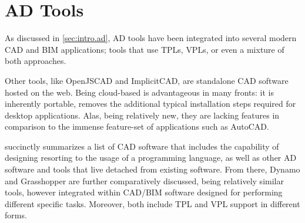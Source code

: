 \section{\acl{AD} Tools}%
\label{sec:related.ad}

As discussed in \cref{sec:intro.ad}, \ac{AD} tools have been integrated into
several modern \ac{CAD} and \ac{BIM} applications; tools that use \acp{TPL},
\acp{VPL}, or even a mixture of both approaches.

Other tools, like OpenJSCAD and ImplicitCAD, are standalone \ac{CAD} software
hosted on the web.  Being cloud-based is advantageous in many fronts: it is
inherently portable, removes the additional typical installation steps required
for desktop applications.  Alas, being relatively new, they are lacking features
in comparison to the immense feature-set of applications such as AutoCAD\@.

 succinctly summarizes a list of \ac{CAD} software
that includes the capability of designing resorting to the usage of a
programming language, as well as other \ac{AD} software and tools that live
detached from existing software.  From there, Dynamo and Grasshopper are further
comparatively discussed, being relatively similar tools, however integrated
within \ac{CAD}/\ac{BIM} software designed for performing different specific
tasks.  Moreover, both include \ac{TPL} and \ac{VPL} support in different forms.

